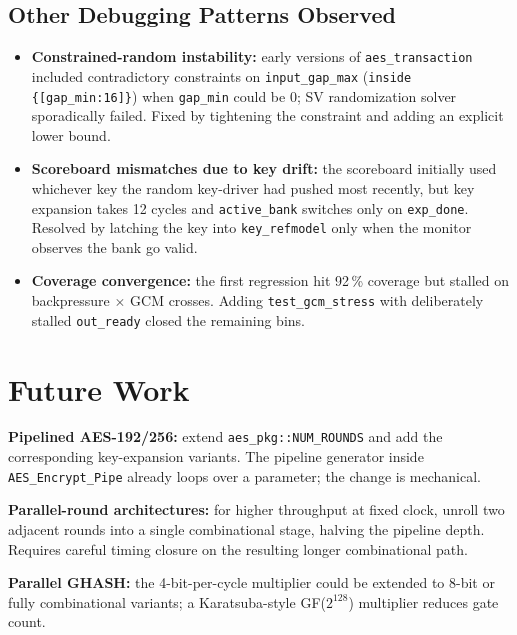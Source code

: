 \documentclass[conference,10pt,a4paper]{IEEEtran}
\begin{document}
\subsection{Other Debugging Patterns Observed}
\begin{itemize}[leftmargin=*]
  \item \textbf{Constrained-random instability:} early versions of
        \texttt{aes\_transaction} included contradictory constraints on
        \texttt{input\_gap\_max} (\texttt{inside\,\{[gap\_min:16]\}})
        when \texttt{gap\_min} could be 0; SV randomization solver
        sporadically failed.  Fixed by tightening the constraint and
        adding an explicit lower bound.
  \item \textbf{Scoreboard mismatches due to key drift:} the
        scoreboard initially used whichever key the random key-driver
        had pushed most recently, but key expansion takes 12 cycles
        and \texttt{active\_bank} switches only on \texttt{exp\_done}.
        Resolved by latching the key into \texttt{key\_refmodel} only
        when the monitor observes the bank go valid.
  \item \textbf{Coverage convergence:} the first regression hit 92\,\%
        coverage but stalled on backpressure $\times$ GCM crosses.
        Adding \texttt{test\_gcm\_stress} with deliberately stalled
        \texttt{out\_ready} closed the remaining bins.
\end{itemize}

\section{Future Work}
\label{sec:future}

\textbf{Pipelined AES-192/256:} extend \texttt{aes\_pkg::NUM\_ROUNDS}
and add the corresponding key-expansion variants.  The pipeline
generator inside \texttt{AES\_Encrypt\_Pipe} already loops over a
parameter; the change is mechanical.

\textbf{Parallel-round architectures:} for higher throughput at fixed
clock, unroll two adjacent rounds into a single combinational stage,
halving the pipeline depth.  Requires careful timing closure on
the resulting longer combinational path.

\textbf{Parallel GHASH:} the 4-bit-per-cycle multiplier could be
extended to 8-bit or fully combinational variants; a Karatsuba-style
GF($2^{128}$) multiplier reduces gate count.
\end{document}
